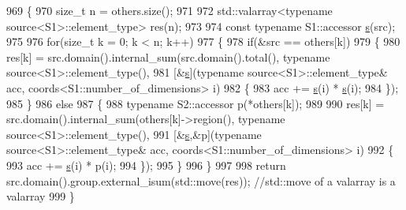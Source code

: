 \begin{DoxyCode}
969                 \{
970                     \textcolor{keywordtype}{size\_t} n = others.size();
971 
972                     std::valarray<typename source<S1>::element\_type> res(n);
973 
974                     \textcolor{keyword}{const} \textcolor{keyword}{typename} S1::accessor \hyperlink{classshark_1_1_group_a6c59f34c15be2873372cd006c2939da2}{s}(src);
975 
976                     \textcolor{keywordflow}{for}(\textcolor{keywordtype}{size\_t} k = 0; k < n; k++)
977                     \{
978                         \textcolor{keywordflow}{if}(&src == others[k])
979                         \{
980                             res[k] = src.domain().internal\_sum(src.domain().total(), \textcolor{keyword}{typename} 
      source<S1>::element\_type(),
981                             [&\hyperlink{classshark_1_1_group_a6c59f34c15be2873372cd006c2939da2}{s}](\textcolor{keyword}{typename} source<S1>::element\_type& acc, coords<S1::number\_of\_dimensions> 
      i)
982                             \{
983                                 acc += \hyperlink{classshark_1_1_group_a6c59f34c15be2873372cd006c2939da2}{s}(i) * \hyperlink{classshark_1_1_group_a6c59f34c15be2873372cd006c2939da2}{s}(i);
984                             \});
985                         \}
986                         \textcolor{keywordflow}{else}
987                         \{
988                             \textcolor{keyword}{typename} S2::accessor p(*others[k]);
989 
990                             res[k] = src.domain().internal\_sum(others[k]->region(), \textcolor{keyword}{typename} 
      source<S1>::element\_type(),
991                             [&\hyperlink{classshark_1_1_group_a6c59f34c15be2873372cd006c2939da2}{s},&p](\textcolor{keyword}{typename} source<S1>::element\_type& acc, 
      coords<S1::number\_of\_dimensions> i)
992                             \{
993                                 acc += \hyperlink{classshark_1_1_group_a6c59f34c15be2873372cd006c2939da2}{s}(i) * p(i);
994                             \});
995                         \}
996                     \}
997 
998                     \textcolor{keywordflow}{return} src.domain().group.external\_isum(std::move(res)); \textcolor{comment}{//std::move of a valarray is a
       valarray}
999                 \}
\end{DoxyCode}
\hypertarget{namespaceshark_1_1ndim_ac0114ef6c7c29d0b6cd96cf61f6cc089}{}\label{namespaceshark_1_1ndim_ac0114ef6c7c29d0b6cd96cf61f6cc089} 
